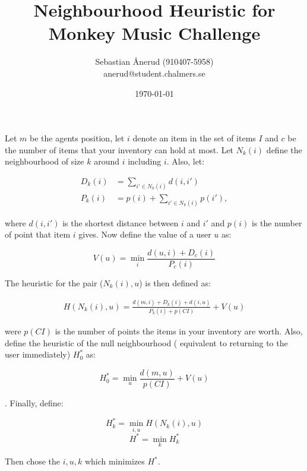\documentclass[11pt]{article}
\begin{document}
\title{Neighbourhood Heuristic for Monkey Music Challenge}
\author{Sebastian Ånerud (910407-5958) \\
		anerud@student.chalmers.se}
\date{\today}
\maketitle

\begin{flushleft}

Let $m$ be the agents position, let $i$ denote an item in the set of items $I$ and $c$ be the number of items that your inventory can hold at most. Let $N_k(i)$ define the neighbourhood of size $k$ around $i$ including $i$. Also, let:

\begin{align*}
D_k(i) &= \sum\limits_{i'\in N_k(i)} d(i,i') \\
P_k(i) &= p(i) + \sum\limits_{i'\in N_k(i)} p(i'),
\end{align*}

where $d(i,i')$ is the shortest distance between $i$ and $i'$ and $p(i)$ is the number of point that item $i$ gives. Now define the value of a user $u$ as:

$$V(u) = \min\limits_{i} \frac{d(u,i) + D_c(i)}{P_c(i)}$$

The heuristic for the pair ($N_k(i), u$) is then defined as:

\begin{align*}
H(N_k(i),u) = \frac{d(m,i) + D_k(i) + d(i,u)}{P_k(i) + p(CI)} + V(u)
\end{align*}

were $p(CI)$ is the number of points the items in your inventory are worth. Also, define the heuristic of the null neighbourhood ( equivalent to returning to the user immediately) $H^*_0$ as:

$$H^*_0 = \min\limits_{u} \frac{d(m,u)}{p(CI)} + V(u)$$

. Finally, define:

$$H_k^* = \min\limits_{i,u} H(N_k(i),u)$$
$$H^* = \min\limits_{k} H_k^*$$

Then chose the $i,u,k$ which minimizes $H^*$.
\end{flushleft}
\end{document}
